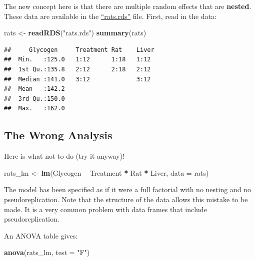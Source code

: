 \documentclass[]{book}
\newenvironment{Shaded}{\begin{snugshade}}{\end{snugshade}}
\newcommand{\KeywordTok}[1]{\textcolor[rgb]{0.13,0.29,0.53}{\textbf{#1}}}
\newcommand{\DataTypeTok}[1]{\textcolor[rgb]{0.13,0.29,0.53}{#1}}
\newcommand{\StringTok}[1]{\textcolor[rgb]{0.31,0.60,0.02}{#1}}
\newcommand{\OperatorTok}[1]{\textcolor[rgb]{0.81,0.36,0.00}{\textbf{#1}}}
\newcommand{\NormalTok}[1]{#1}
\theoremstyle{definition}
\theoremstyle{definition}
\theoremstyle{definition}
\theoremstyle{remark}
\begin{document}
The new concept here is that there are multiple random effects that are
\textbf{nested}. These data are available in the
\href{https://exeter-data-analytics.github.io/StatModelling/_data/rats.rds}{``rats.rds''}
file. First, read in the data:

\begin{Shaded}
\begin{Highlighting}[]
\NormalTok{rats <-}\StringTok{ }\KeywordTok{readRDS}\NormalTok{(}\StringTok{"rats.rds"}\NormalTok{)}
\KeywordTok{summary}\NormalTok{(rats)}
\end{Highlighting}
\end{Shaded}

\begin{verbatim}
##     Glycogen     Treatment Rat    Liver 
##  Min.   :125.0   1:12      1:18   1:12  
##  1st Qu.:135.8   2:12      2:18   2:12  
##  Median :141.0   3:12             3:12  
##  Mean   :142.2                          
##  3rd Qu.:150.0                          
##  Max.   :162.0
\end{verbatim}

\subsection{The Wrong Analysis}\label{the-wrong-analysis}

Here is what not to do (try it anyway)!

\begin{Shaded}
\begin{Highlighting}[]
\NormalTok{rats_lm <-}\StringTok{ }\KeywordTok{lm}\NormalTok{(Glycogen }\OperatorTok{~}\StringTok{ }\NormalTok{Treatment }\OperatorTok{*}\StringTok{ }\NormalTok{Rat }\OperatorTok{*}\StringTok{ }\NormalTok{Liver, }\DataTypeTok{data =}\NormalTok{ rats)}
\end{Highlighting}
\end{Shaded}

The model has been specified as if it were a full factorial with no
nesting and no pseudoreplication. Note that the structure of the data
allows this mistake to be made. It is a very common problem with data
frames that include pseudoreplication.

\newpage

An ANOVA table gives:

\begin{Shaded}
\begin{Highlighting}[]
\KeywordTok{anova}\NormalTok{(rats_lm, }\DataTypeTok{test =} \StringTok{"F"}\NormalTok{)}
\end{Highlighting}
\end{Shaded}
\end{document}
